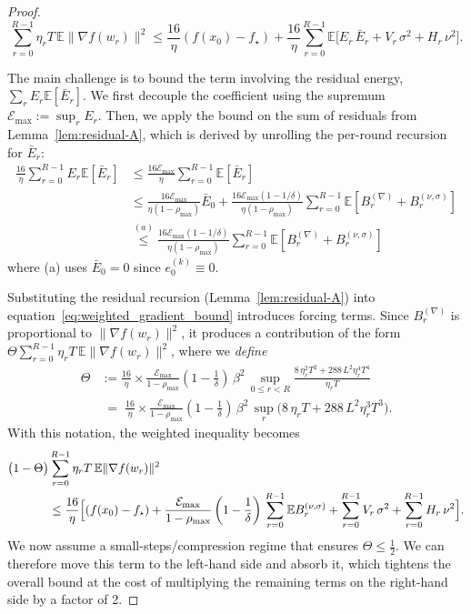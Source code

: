 \documentclass{article} %
\def\eqref#1{equation~\ref{#1}}
\newcommand{\E}{\mathbb{E}}
\begin{document}
\begin{proof}
\begin{equation}
\label{eq:weighted_gradient_bound}
\sum_{r=0}^{R-1} \eta_r T\,\E\|\nabla f(w_r)\|^{2} \le \frac{16}{\eta}(f(x_0)-f_\star) + \frac{16}{\eta}\sum_{r=0}^{R-1}\E\!\bigl[E_r\,\bar E_r + V_r\,\sigma^{2} + H_r\,\nu^{2}\bigr].
\end{equation}


The main challenge is to bound the term involving the residual energy, $\sum_r E_r \E[\bar{E}_r]$. We first decouple the coefficient using the supremum $\mathcal{E}_{\max} := \sup_r E_r$. Then, we apply the bound on the sum of residuals from Lemma~\ref{lem:residual-A}, which is derived by unrolling the per-round recursion for $\bar{E}_r$:
\begin{align*}
\frac{16}{\eta} \sum_{r=0}^{R-1} E_r \E[\bar{E}_r] &\le \frac{16\mathcal{E}_{\max}}{\eta} \sum_{r=0}^{R-1} \E[\bar{E}_r] \\
&\le \frac{16\mathcal{E}_{\max}}{\eta(1-\rho_{\max})} \bar{E}_0 + \frac{16\mathcal{E}_{\max}(1-1/\delta)}{\eta(1-\rho_{\max})} \sum_{r=0}^{R-1} \E[B_r^{(\nabla)} + B_r^{(\nu,\sigma)}] \\
&\overset{(a)}{\le} \frac{16\mathcal{E}_{\max}(1-1/\delta)}{\eta(1-\rho_{\max})} \sum_{r=0}^{R-1} \E[B_r^{(\nabla)} + B_r^{(\nu,\sigma)}]
\end{align*}
where \textnormal{(a)} uses $\bar E_0=0$ since $e_0^{(k)}\equiv0$.

Substituting the residual recursion (Lemma~\ref{lem:residual-A}) into \eqref{eq:weighted_gradient_bound} introduces forcing terms.
Since \(B_r^{(\nabla)}\) is proportional to \(\|\nabla f(w_r)\|^2\),
it produces a contribution of the form
\(\Theta\sum_{r=0}^{R-1}\eta_r T\,\E\|\nabla f(w_r)\|^2\),
where we \emph{define}
\[ 
\begin{aligned}\label{eq:def-Theta}
\Theta
&:= \frac{16}{\eta}\times \frac{\mathcal{E}_{\max}}{1-\rho_{\max}}
\left(1-\frac{1}{\delta}\right)\,\beta^{2}\,
\sup_{0\le r<R}\frac{8\,\eta_r^{2}T^{2}+288\,L^{2}\eta_r^{4}T^{4}}{\eta_r T}\\
&\;=\;\frac{16}{\eta}\times \frac{\mathcal{E}_{\max}}{1-\rho_{\max}}
\left(1-\frac{1}{\delta}\right)\,\beta^{2}\,
\sup_{r}\bigl(8\,\eta_r T+288\,L^{2}\eta_r^{3}T^{3}\bigr).
\end{aligned}
\]
With this notation, the weighted inequality becomes
\begin{align}\label{eq:absorb-ineq} \notag
\bigl(1-\Theta\bigr)&\sum_{r=0}^{R-1}\eta_r T\,\E\|\nabla f(w_r)\|^2\\
&\le
\frac{16}{\eta}\Bigl[(f(x_0)-f_\star)
+\frac{\mathcal{E}_{\max}}{1-\rho_{\max}}\left(1-\frac{1}{\delta}\right)\,\sum_{r=0}^{R-1}\E B_r^{(\nu,\sigma)}
+\sum_{r=0}^{R-1}V_r\,\sigma^2+\sum_{r=0}^{R-1}H_r\,\nu^2\Bigr].
\end{align}
We now assume a small-steps/compression regime that ensures \(\Theta\le \tfrac12\). We can therefore move this term to the left-hand side and absorb it, which tightens the overall bound at the cost of multiplying the remaining terms on the right-hand side by a factor of 2.


\end{proof}
\end{document}
